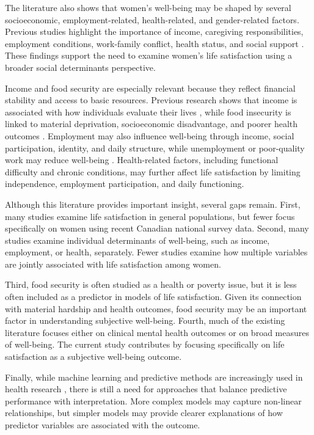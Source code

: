 \documentclass[12pt]{article}
\begin{document}
The literature also shows that women's well-being may be shaped by several socioeconomic, employment-related, health-related, and gender-related factors. Previous studies highlight the importance of income, caregiving responsibilities, employment conditions, work-family conflict, health status, and social support \citep{denton2004, matud2014, artazcoz2004, bilodeau2025}. These findings support the need to examine women's life satisfaction using a broader social determinants perspective.

Income and food security are especially relevant because they reflect financial stability and access to basic resources. Previous research shows that income is associated with how individuals evaluate their lives \citep{kahneman2010}, while food insecurity is linked to material deprivation, socioeconomic disadvantage, and poorer health outcomes \citep{tarasuk2023}. Employment may also influence well-being through income, social participation, identity, and daily structure, while unemployment or poor-quality work may reduce well-being \citep{clark1994, butterworth2011}. Health-related factors, including functional difficulty and chronic conditions, may further affect life satisfaction by limiting independence, employment participation, and daily functioning.

Although this literature provides important insight, several gaps remain. First, many studies examine life satisfaction in general populations, but fewer focus specifically on women using recent Canadian national survey data. Second, many studies examine individual determinants of well-being, such as income, employment, or health, separately. Fewer studies examine how multiple variables are jointly associated with life satisfaction among women.

Third, food security is often studied as a health or poverty issue, but it is less often included as a predictor in models of life satisfaction. Given its connection with material hardship and health outcomes, food security may be an important factor in understanding subjective well-being. Fourth, much of the existing literature focuses either on clinical mental health outcomes or on broad measures of well-being. The current study contributes by focusing specifically on life satisfaction as a subjective well-being outcome.

Finally, while machine learning and predictive methods are increasingly used in health research \citep{shatte2019}, there is still a need for approaches that balance predictive performance with interpretation. More complex models may capture non-linear relationships, but simpler models may provide clearer explanations of how predictor variables are associated with the outcome.
\end{document}
